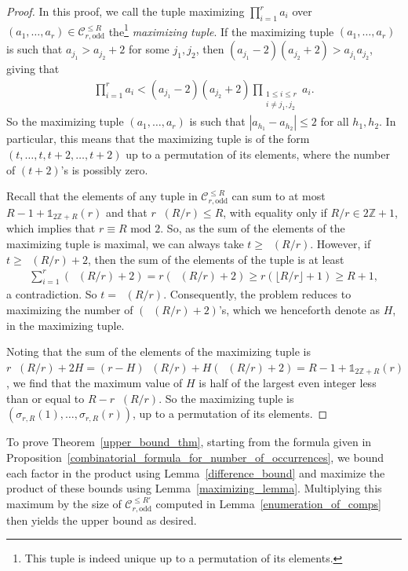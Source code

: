\documentclass[11pt]{amsart}
\newcommand{\ZZ}{\mathbb{Z}}
\DeclareMathOperator{\oddleq}{\mathcal{O}_{\leq}}
\begin{document}
\begin{proof}
    In this proof, we call the tuple maximizing $\prod_{i=1}^{r}a_i$ over $(a_1,\dots,a_r)\in\mathscr{C}_{r,\text{odd}}^{\leq R}$ the\footnote{This tuple is indeed unique up to a permutation of its elements.} \emph{maximizing tuple}. If the maximizing tuple $(a_1,\dots,a_r)$ is such that $a_{j_1}>a_{j_2}+2$ for some $j_1,j_2$, then $(a_{j_1}-2)(a_{j_2}+2)>a_{j_{1}}a_{j_2}$, giving that
    \begin{align*}
        \prod_{i=1}^{r}a_i<(a_{j_1}-2)(a_{j_2}+2)\prod_{\substack{1\leq i\leq r\\ i\neq j_1,j_2}}a_i.
    \end{align*}
    So the maximizing tuple $(a_1,\dots,a_r)$ is such that $|a_{h_1}-a_{h_2}|\leq 2$ for all $h_1,h_2$. In particular, this means that the maximizing tuple is of the form $(t,\dots,t,t+2,\dots,t+2)$ up to a permutation of its elements, where the number of $(t+2)$'s is possibly zero.

    Recall that the elements of any tuple in $\mathscr{C}_{r,\text{odd}}^{\leq R}$ can sum to at most $R-1+\mathds{1}_{2\ZZ+R}(r)$ and that $r\oddleq(R/r)\leq R$, with equality only if $R/r\in2\ZZ+1$, which implies that $r\equiv R\text{~mod~} 2$. So, as the sum of the elements of the maximizing tuple is maximal, we can always take $t\geq \oddleq(R/r)$. However, if $t\geq \oddleq(R/r)+2$, then the sum of the elements of the tuple is at least
    \begin{align}\label{sum_of_elements_contra}
        \sum_{i=1}^{r}(\oddleq(R/r)+2)=r(\oddleq(R/r)+2)\geq r(\lfloor R/r\rfloor+1)\geq R+1,
    \end{align}
    a contradiction. So $t=\oddleq(R/r)$. Consequently, the problem reduces to maximizing the number of $(\oddleq(R/r)+2)$'s, which we henceforth denote as $H$, in the maximizing tuple.

    Noting that the sum of the elements of the maximizing tuple is $r\oddleq(R/r)+2H=(r-H)\oddleq(R/r)+H(\oddleq(R/r)+2)=R-1+\mathds{1}_{2\ZZ+R}(r)$, we find that the maximum value of $H$ is half of the largest even integer less than or equal to $R-r\oddleq(R/r)$. So the maximizing tuple is $(\sigma_{r,R}(1),\dots,\sigma_{r,R}(r))$, up to a permutation of its elements.
\end{proof}

To prove Theorem~\ref{upper_bound_thm}, starting from the formula given in Proposition~\ref{combinatorial_formula_for_number_of_occurrences}, we bound each factor in the product using Lemma~\ref{difference_bound} and maximize the product of these bounds using Lemma~\ref{maximizing_lemma}. Multiplying this maximum by the size of $\mathscr{C}_{r,\text{odd}}^{\leq R'}$ computed in Lemma~\ref{enumeration_of_comps} then yields the upper bound as desired.
\end{document}

